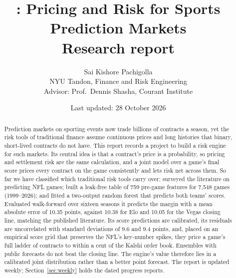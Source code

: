 \documentclass[11pt]{article}
\title{\aname: Pricing and Risk for Sports Prediction Markets\\[4pt]\large Research report}
\author{Sai Kishore Pachigolla\\ \small NYU Tandon, Finance and Risk Engineering \\ \small Advisor: Prof.\ Dennis Shasha, Courant Institute}
\date{Last updated: 28 October 2026}
\begin{document}
\maketitle

\begin{abstract}
\noindent Prediction markets on sporting events now trade billions of contracts a season, yet the risk tools of traditional finance assume continuous prices and long histories that binary, short-lived contracts do not have. This report records a project to build a risk engine for such markets. Its central idea is that a contract's price is a probability, so pricing and settlement risk are the same calculation, and a joint model over a game's final score prices every contract on the game consistently and lets risk net across them. So far we have classified which traditional risk tools carry over; surveyed the literature on predicting NFL games; built a leak-free table of 759 pre-game features for 7,548 games (1999--2026); and fitted a two-output random forest that predicts both teams' scores. Evaluated walk-forward over sixteen seasons it predicts the margin with a mean absolute error of 10.35 points, against 10.38 for Elo and 10.05 for the Vegas closing line, matching the published literature. Its score predictions are calibrated, its residuals are uncorrelated with standard deviations of 9.6 and 9.4 points, and, placed on an empirical score grid that preserves the NFL's key-number spikes, they price a game's full ladder of contracts to within a cent of the Kalshi order book. Ensembles with public forecasts do not beat the closing line. The engine's value therefore lies in a calibrated joint distribution rather than a better point forecast. The report is updated weekly; Section~\ref{sec:weekly} holds the dated progress reports.
\end{abstract}

\tableofcontents











\end{document}
